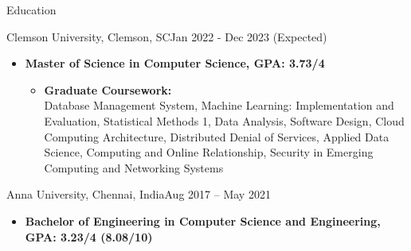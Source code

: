 \documentclass[]{mcdowellcv}
\begin{document}
\begin{cvsection}{Education}
  
            \begin{cvsubsection}{Clemson University, Clemson, SC}{}{Jan 2022 - Dec 2023 (Expected)}
                \begin{itemize}
                    \item \textbf{Master of Science in Computer Science, GPA: 3.73/4}
                    \begin{itemize}
                        \item \textbf{Graduate Coursework: }\\ Database Management System, Machine Learning: Implementation and Evaluation, Statistical Methods 1, Data Analysis, Software Design, Cloud Computing Architecture, Distributed Denial of Services, Applied Data Science, Computing and Online Relationship, Security in Emerging Computing and Networking Systems
                    \end{itemize}
                \end{itemize}
            \end{cvsubsection}
		\begin{cvsubsection}{Anna University, Chennai, India}{}{Aug 2017 -- May 2021}
			\begin{itemize}
				\item \textbf{Bachelor of Engineering in Computer Science and Engineering, GPA: 3.23/4 (8.08/10)}
			\end{itemize}
		\end{cvsubsection}
	\end{cvsection}
\end{document}
